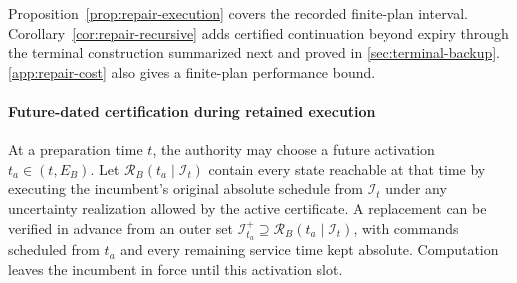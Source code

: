 \documentclass[preprint,12pt]{elsarticle}
\newcommand{\appref}[1]{\ref{#1}}
\begin{document}
Proposition~\ref{prop:repair-execution} covers the recorded finite-plan
interval. Corollary~\ref{cor:repair-recursive} adds certified continuation
beyond expiry through the terminal construction summarized next and proved in
\appref{sec:terminal-backup}. \appref{app:repair-cost} also gives
a finite-plan performance bound.

\paragraph{Future-dated certification during retained execution}
\label{sec:planned-handover}
At a preparation time $t$, the authority may choose a future activation
$t_a\in(t,E_B)$. Let $\mathcal R_B(t_a\mid\mathcal I_t)$ contain every state
reachable at that time by executing the incumbent's original absolute
schedule from $\mathcal I_t$ under any uncertainty realization allowed by
the active certificate. A
replacement can be verified in advance from an outer set
$\mathcal I_{t_a}^+\supseteq\mathcal R_B(t_a\mid\mathcal I_t)$, with commands
scheduled from $t_a$ and every remaining service time kept absolute.
Computation leaves the incumbent in force until this activation slot.
\end{document}
